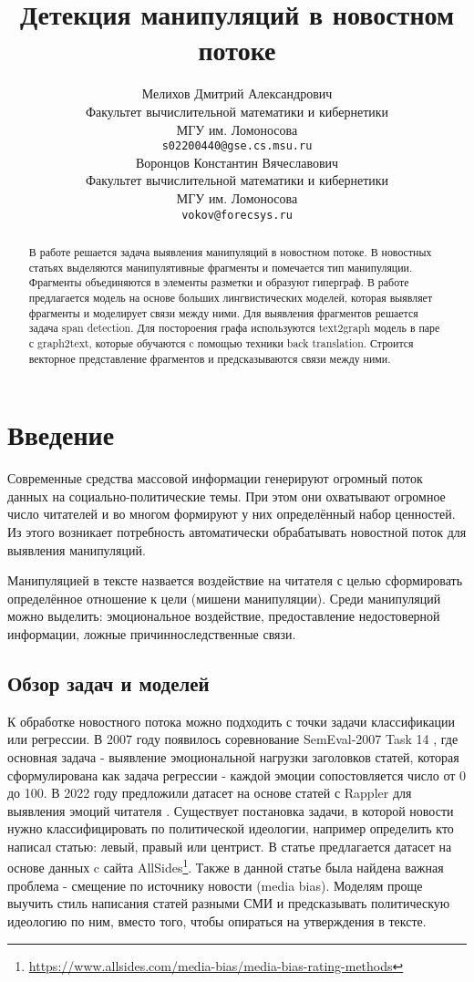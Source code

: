 \documentclass{article}
\title{Детекция манипуляций в новостном потоке}
\author{ Мелихов Дмитрий Александрович \\
        Факультет вычислительной математики и кибернетики \\
        МГУ им. Ломоносова \\
        \texttt{s02200440@gse.cs.msu.ru} \\
	\And
	Воронцов Константин Вячеславович \\
        Факультет вычислительной математики и кибернетики \\
        МГУ им. Ломоносова \\
        \texttt{vokov@forecsys.ru} \\
}
\date{}
\begin{document}
\maketitle

\begin{abstract}
В работе решается задача выявления манипуляций в новостном потоке. В новостных статьях выделяются манипулятивные фрагменты и помечается тип манипуляции. Фрагменты объединяются в элементы разметки и образуют гиперграф. В работе предлагается модель на основе больших лингвистических моделей, которая выявляет фрагменты и моделирует связи между ними. Для выявления фрагментов решается задача span detection. Для постороения графа используются text2graph модель в паре с graph2text, которые обучаются c помощью техники back translation. Строится векторное представление фрагментов и предсказываются связи между ними.
\end{abstract}



\section{Введение}

Современные средства массовой информации генерируют огромный поток данных на социально-политические темы. При этом они охватывают огромное число читателей и во многом формируют у них определённый набор ценностей. Из этого возникает потребность автоматически обрабатывать новостной поток для выявления манипуляций.

Манипуляцией в тексте назвается воздействие на читателя с целью сформировать определённое отношение к цели (мишени манипуляции). Среди манипуляций можно выделить: эмоциональное воздействие, предоставление недостоверной информации, ложные причинноследственные связи.

\subsection{Обзор задач и моделей}

К обработке новостного потока можно подходить с точки задачи классификации или регрессии. В 2007 году появилось соревнование SemEval-2007 Task 14 \cite{strapparava2007semeval}, где основная задача - выявление эмоциональной нагрузки заголовков статей, которая сформулирована как задача регрессии - каждой эмоции сопостовляется число от 0 до 100. В 2022 году предложили датасет на основе статей с Rappler для выявления эмоций читателя \cite{anoop22readers}.
Существует постановка задачи, в которой новости нужно классифицировать по политической идеологии, например определить кто написал статью: левый, правый или центрист. В статье \cite{bias} предлагается датасет на основе данных c сайта AllSides\footnote{\url{https://www.allsides.com/media-bias/media-bias-rating-methods}}. Также в данной статье была найдена важная проблема - смещение по источнику новости (media bias). Моделям проще выучить стиль написания статей разными СМИ и предсказывать политическую идеологию по ним, вместо того, чтобы опираться на утверждения в тексте.
\end{document}
